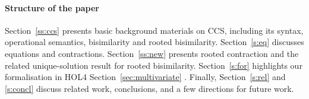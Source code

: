 \paragraph{Structure of the paper}

Section~\ref{ss:ccs} presents basic background materials on CCS,
including its syntax, operational semantics, bisimilarity and rooted
bisimilarity.
Section~\ref{s:eq} discusses equations and contractions.
Section~\ref{ss:new} presents rooted contraction and the related
unique-solution result for rooted bisimilarity.
Section~\ref{s:for} highlights our formalisation in HOL4 
Section~\ref{sec:multivariate} . 
Finally,  Section~\ref{s:rel} and \ref{s:concl} discuss related work,
conclusions, and a few directions for future work.

